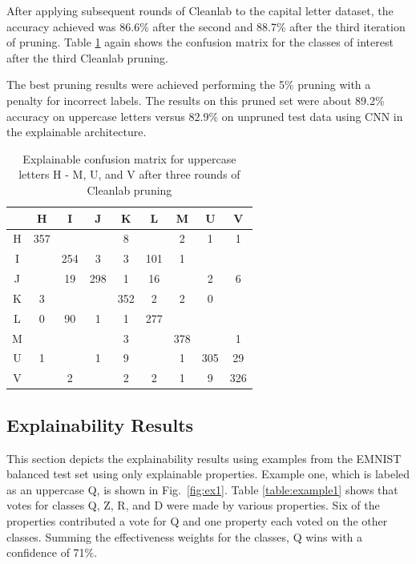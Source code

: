 \documentclass[conference]{IEEEtran}
\begin{document}
After applying subsequent rounds of Cleanlab to the capital letter dataset, the
accuracy achieved was 86.6\% after the second and 88.7\% after the third
iteration of pruning. Table \ref{raw_cap_cleanlab_third_confusion_matrix} again
shows the confusion matrix for the classes of interest after the third Cleanlab
pruning.

The best pruning results were achieved performing the 5\% pruning with a penalty
for incorrect labels.  The results on this pruned set were about 89.2\% accuracy
on uppercase letters versus 82.9\% on unpruned test data using CNN in the
explainable architecture.  

\begin{table}
    \centering
    \caption{Explainable confusion matrix for uppercase letters H - M, U, and V after three rounds of Cleanlab pruning}
    \begin{tabular}{ |c|c|c|c|c|c|c|c|c|}
    \hline
    ~ & H & I & J & K & L & M & U & V \\
    \hline
    H & 357 & &  & 8 & & 2 & 1 & 1 \\
    \hline
    I &  & 254 & 3 & 3 & 101 & 1 & & \\
    \hline
    J & & 19 & 298 & 1 & 16 & & 2 & 6 \\
    \hline
    K & 3 &  &  & 352 & 2 & 2 & 0 & \\
    \hline
    L & 0 & 90 & 1 & 1 & 277 & & & \\
    \hline
    M & & & & 3 & & 378 & & 1 \\
    \hline
    U & 1 & & 1 & 9 & & 1 & 305 & 29 \\
    \hline
    V & & 2 & & 2 & 2 & 1 & 9 & 326 \\
    \hline
    \end{tabular}
    \label{raw_cap_cleanlab_third_confusion_matrix}
\end{table}


\subsection{Explainability Results}
\label{results:exp}


This section depicts the explainability results using examples from the EMNIST
balanced test set using only explainable properties.  Example one, which is
labeled as an uppercase Q, is shown in Fig.~\ref{fig:ex1}.  Table
\ref{table:example1} shows that votes for classes Q, Z, R, and D were made by
various properties.  Six of the properties contributed a vote for Q and one
property each voted on the other classes.  Summing the effectiveness weights for
the classes, Q wins with a confidence of 71\%.
\end{document}
